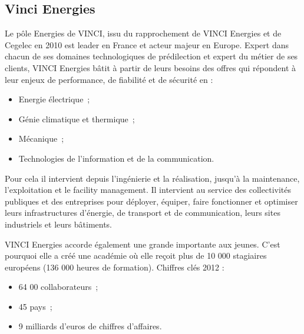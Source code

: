     \subsection{Vinci Energies}
    	Le pôle Energies de VINCI, issu du rapprochement de VINCI Energies et de Cegelec en 2010 est leader en France et acteur majeur en Europe.
    	Expert dans chacun de ses domaines technologiques de prédilection et expert du métier de ses clients, VINCI Energies bâtit à partir de leurs besoins des offres qui répondent à leur enjeux de performance, de fiabilité et de sécurité en :
        \begin{itemize}
        	\item Energie électrique~;
        	\item Génie climatique et thermique~;
        	\item Mécanique~;
        	\item Technologies de l'information et de la communication.
        \end{itemize}
        \bigbreak
    	Pour cela il intervient depuis l'ingénierie et la réalisation, jusqu'à la maintenance, l'exploitation et le facility management. Il intervient au service des collectivités publiques et des entreprises pour déployer, équiper, faire fonctionner et optimiser leurs infrastructures d'énergie, de transport et de communication, leurs sites industriels et leurs bâtiments.

    	VINCI Energies accorde également une grande importante aux jeunes. C'est pourquoi elle a créé une académie où elle reçoit plus de 10 000 stagiaires européens (136 000 heures de formation).
        \newpage
        Chiffres clés 2012 :
        \begin{itemize}
        	\item 64 00 collaborateurs~;
        	\item 45 pays~;
        	\item 9 milliards d'euros de chiffres d'affaires.
        \end{itemize}

